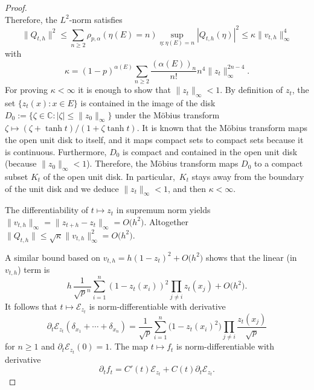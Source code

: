 \documentclass[pdftex]{sigma}
\numberwithin{equation}{section}
\newcommand{\1}{\mathbbm{1}}
\begin{document}
\begin{proof}
\[\]
Therefore, the $L^2$-norm satisfies
\[
	\|Q_{t,h}\|^2 \leq \sum_{n\geq 2} \rho_{p,\alpha}(\eta(E) = n) \sup_{\eta\colon   \eta(E) = n}|Q_{t,h}(\eta)|^2
	 \leq \kappa \|v_{t,h}\|_\infty^4
\]
with
\[
	\kappa = (1-p)^{\alpha(E)} \sum_{n\geq 2} \frac{(\alpha(E))_n}{n!} n^4 \|z_t\|_\infty^{2n-4}.
\]
For proving $\kappa <\infty$ it is enough to show that $\|z_t\|_\infty <1$. By definition of $z_t$, the set $\{z_t(x)\colon {x\in E}\}$ is contained in the image of the disk $D_0:=\{\zeta \in \mathbb C\colon |\zeta|\leq \|z_0\|_\infty\}$ under the M{\"o}bius transform $\zeta \mapsto (\zeta + \tanh t)/(1+ \zeta \tanh t)$. It is known that the M{\"o}bius transform maps the open unit disk to itself, and it maps compact sets to compact sets because it is continuous. Furthermore, $D_0$ is compact and contained in the open unit disk (because $\|z_0\|_\infty <1$). Therefore, the M{\"o}bius transform maps $D_0$ to a compact subset $K_t$ of the open unit disk. In particular,~$K_t$ stays away from the boundary of the unit disk and we deduce $\|z_t\|_\infty <1$, and then $\kappa <\infty$.

The differentiability of $t\mapsto z_t$ in supremum norm yields $\|v_{t,h}\|_\infty = \|z_{t+h} - z_t\|_\infty = O\bigl(h^2\bigr)$. Altogether $\|Q_{t,h}\| \leq \sqrt \kappa \|v_{t,h}\|_\infty^2 =O\bigl(h^2\bigr)$.

 A similar bound based on $v_{t,h} = h (1-z_t)^2 + O\bigl(h^2\bigr)$ shows that the linear (in $v_{t,h}$) term is
\[
	h\, \frac{1}{{\sqrt p}^n}\sum_{i=1}^n (1-z_t(x_i))^2 \prod_{j\neq i} z_t(x_j) + O\bigl(h^2\bigr).
\]
It follows that $t\mapsto \mathcal E_{z_t}$ is norm-differentiable with derivative
\begin{equation} \label{eq:ezdiff}
	\partial_t \mathcal E_{z_t}(\delta_{x_1}+\cdots +\delta_{x_n})
	= \frac{1}{\sqrt p} \sum_{i=1}^n \bigl(1-z_t(x_i)^2\bigr) \prod_{j\neq i } \frac{z_t(x_j)}{\sqrt p}
\end{equation}
for $n\geq 1$ and $\partial_t\mathcal E_{z_t}(0) =1$. The map $t\mapsto f_t$ is norm-differentiable with derivative
\begin{equation}\label{eq:ftdiff}
	\partial_t f_t = C'(t) \mathcal E_{z_t}+ C(t) \partial_t \mathcal E_{z_t}.
\end{equation}


\end{proof}
\end{document}
